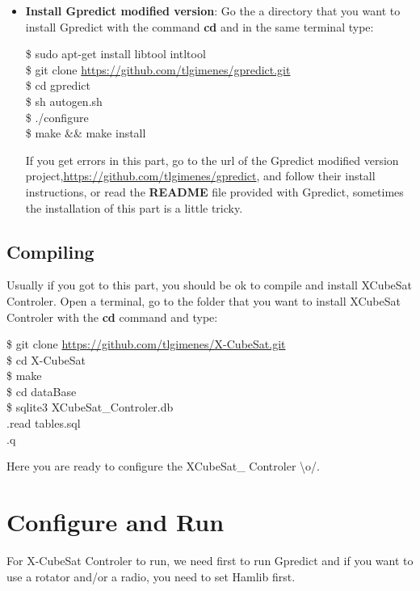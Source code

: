 \documentclass[pdftex,11pt,a4paper,titlepage]{report}
\begin{document}
\begin{itemize}
\item \textbf{Install Gpredict modified version}: Go the a directory that you want to install Gpredict with the command \textbf{cd} and in the same terminal type:
\begin{framed}
\$ sudo apt-get install libtool intltool \\
\$ git clone \url{https://github.com/tlgimenes/gpredict.git} \\
\$ cd gpredict \\
\$ sh autogen.sh \\
\$ ./configure \\
\$ make \&\& make install
\end{framed}
If you get errors in this part, go to the url of the Gpredict modified version project,\url{https://github.com/tlgimenes/gpredict}, and follow their install instructions, or read the \textbf{README} file provided with Gpredict, sometimes the installation of this part is a little tricky. 
\end{itemize}

\section{Compiling}
Usually if you got to this part, you should be ok to compile and install XCubeSat Controler. Open a terminal, go to the folder that you want to install XCubeSat Controler with the \textbf{cd} command and type:

\begin{framed}
\$ git clone \url{https://github.com/tlgimenes/X-CubeSat.git} \\
\$ cd X-CubeSat \\
\$ make \\
\$ cd dataBase \\
\$ sqlite3 XCubeSat\_Controler.db \\
.read tables.sql \\
.q
\end{framed}

Here you are ready to configure the XCubeSat\_ Controler \textbackslash o/.

\chapter{Configure and Run}
For X-CubeSat Controler to run, we need first to run Gpredict and if you want to use a rotator and/or a radio, you need to set Hamlib first.
\end{document}

